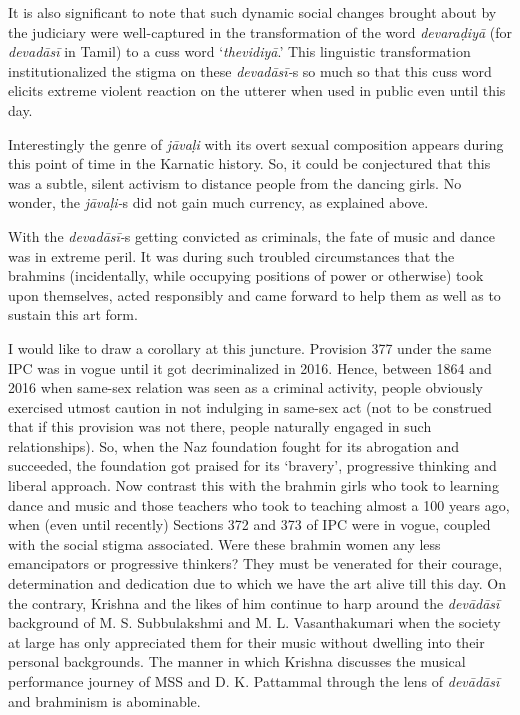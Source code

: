 It is also significant to note that such dynamic social changes brought about by the judiciary were well-captured in the transformation of the word \textit{devaraḍiyā} (for \textit{devadāsī} in Tamil) to a cuss word ‘\textit{thevidiyā}.’ This linguistic transformation institutionalized the stigma on these \textit{devadāsī-}s so much so that this cuss word elicits extreme violent reaction on the utterer when used in public even until this day.

Interestingly the genre of \textit{jāvaḷi} with its overt sexual composition appears during this point of time in the Karnatic history. So, it could be conjectured that this was a subtle, silent activism to distance people from the dancing girls. No wonder, the \textit{jāvaḷi-}s did not gain much currency, as explained above.

With the \textit{devadāsī-}s getting convicted as criminals, the fate of music and dance was in extreme peril. It was during such troubled circumstances that the brahmins (incidentally, while occupying positions of power or otherwise) took upon themselves, acted responsibly and came forward to help them as well as to sustain this art form.

I would like to draw a corollary at this juncture. Provision 377 under the same IPC was in vogue until it got decriminalized in 2016. Hence, between 1864 and 2016 when same-sex relation was seen as a criminal activity, people obviously exercised utmost caution in not indulging in same-sex act (not to be construed that if this provision was not there, people naturally engaged in such relationships). So, when the Naz foundation fought for its abrogation and succeeded, the foundation got praised for its ‘bravery’, progressive thinking and liberal approach. Now contrast this with the brahmin girls who took to learning dance and music and those teachers who took to teaching almost a 100 years ago, when (even until recently) Sections 372 and 373 of IPC were in vogue, coupled with the social stigma associated. Were these brahmin women any less emancipators or progressive thinkers? They must be venerated for their courage, determination and dedication due to which we have the art alive till this day. On the contrary, Krishna and the likes of him continue to harp around the \textit{devādāsī} background of M. S. Subbulakshmi and M. L. Vasanthakumari when the society at large has only appreciated them for their music without dwelling into their personal backgrounds. The manner in which Krishna discusses the musical performance journey of MSS and D. K. Pattammal through the lens of \textit{devādāsī }and brahminism is abominable.

